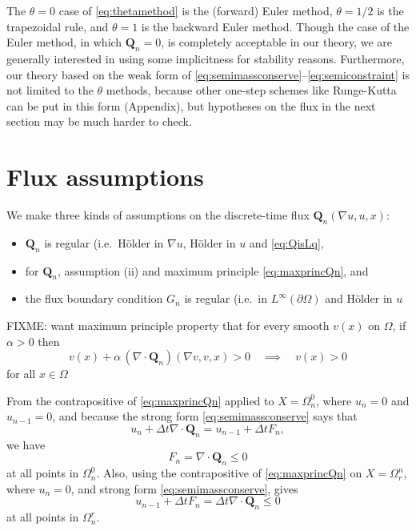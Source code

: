 \documentclass[final,leqno,onefignum,onetabnum]{siamltex1213bueler}
\newcommand\bQ{\mathbf{Q}}
\newcommand{\Div}{\nabla\cdot}
\renewcommand{\grad}{\nabla}
\begin{document}
The $\theta=0$ case of \eqref{eq:thetamethod} is the (forward) Euler method, $\theta=1/2$ is the trapezoidal rule, and $\theta=1$ is the backward Euler method.  Though the case of the Euler method, in which $\bQ_n=0$, is completely acceptable in our theory,  we are generally interested in using some implicitness for stability reasons.  Furthermore, our theory based on the weak form of \eqref{eq:semimassconserve}--\eqref{eq:semiconstraint} is not limited to the $\theta$ methods, because other one-step schemes like Runge-Kutta can be put in this form (Appendix), but hypotheses on the flux in the next section may be much harder to check.


\section{Flux assumptions} \label{sec:fluxassumptions}

We make three kinds of assumptions on the discrete-time flux $\bQ_n(\grad u,u,x)$: \begin{itemize}
\item $\bQ_n$ is regular (i.e.~H\"older in $\grad u$, H\"older in $u$ and \eqref{eq:QisLq},
\item for $\bQ_n$, assumption (ii) and maximum principle \eqref{eq:maxprincQn}, and
\item the flux boundary condition $G_n$ is regular (i.e.~in $L^\infty(\partial\Omega)$ and H\"older in $u$
\end{itemize}

FIXME:  want maximum principle property that for every smooth $v(x)$ on $\Omega$, if $\alpha>0$ then
\begin{equation}
v(x) + \alpha\, (\Div \bQ_n)(\grad v,v,x) > 0 \quad \implies \quad v(x) > 0 \label{eq:maxprincQn}
\end{equation}
for all $x\in\Omega$ 

From the contrapositive of \eqref{eq:maxprincQn} applied to $X = \Omega_n^0$, where $u_n=0$ and $u_{n-1}=0$, and because the strong form \eqref{eq:semimassconserve} says that
   $$u_n + \Delta t \Div \bQ_n = u_{n-1} + \Delta t F_n,$$
we have
\begin{equation}
F_n = \Div \bQ_n \le 0  \label{eq:divfluxnonpositive}
\end{equation}
at all points in $\Omega_n^0$.  Also, using the contrapositive of \eqref{eq:maxprincQn} on $X = \Omega_r^n$, where $u_n=0$, and strong form \eqref{eq:semimassconserve}, gives
\begin{equation}
u_{n-1} + \Delta t F_n = \Delta t \Div\bQ_n \le 0  \label{eq:inequalityonretreat}
\end{equation}
at all points in $\Omega_n^r$.
\end{document}
